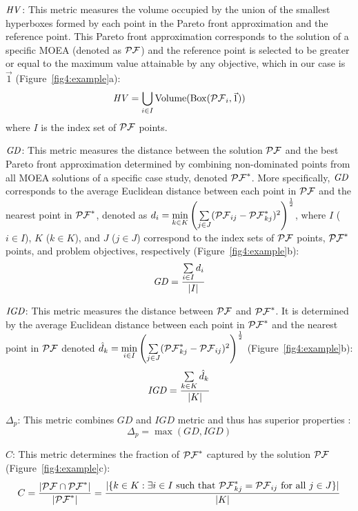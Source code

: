{$\mathit{HV}$: This metric measures the volume occupied by the union of the smallest hyperboxes formed by each point in the Pareto front approximation and the reference point.  This Pareto front approximation corresponds to the solution of a specific MOEA (denoted as $\mathcal{PF}$) and the reference point is selected to be greater or equal to the maximum value attainable by any objective, which in our case is $\vec{1}$ (Figure~\ref{fig4:example}a):
\begin{equation}
	\mathit{HV} = \bigcup\limits_{i\in I}\mathrm{Volume}(\mathrm{Box}(\mathcal{PF}_i,\vec{1})) \label{eq4:hv}
\end{equation}
where $I$ is the index set of $\mathcal{PF}$ points.

$\mathit{GD}$: This metric measures the distance between the solution $\mathcal{PF}$ and the best Pareto front approximation determined by combining non-dominated points from all MOEA solutions of a specific case study, denoted $\mathcal{PF}^*$. More specifically, $\mathit{GD}$ corresponds to the average Euclidean distance between each point in $\mathcal{PF}$ and the nearest point in $\mathcal{PF}^*$, denoted as $d_i=\min\limits_{k \in K}\left( \sum\limits_{j \in J}(\mathcal{PF}_{ij} -\mathcal{PF}^*_{kj})^2 \right)^{\frac{1}{2}}$, where $I$ ($i \in I$), $K$ ($k \in K$), and $J$ ($j \in J$) correspond to the index sets of $\mathcal{PF}$ points, $\mathcal{PF}^*$ points, and problem objectives, respectively (Figure~\ref{fig4:example}b):
\begin{equation}
	 \mathit{GD} = \frac{\sum\limits_{i \in I} d_i}{|I|}
\end{equation}

$\mathit{IGD}$: This metric measures the distance between $\mathcal{PF}$ and $\mathcal{PF}^*$. It is determined by the average Euclidean distance between each point in $\mathcal{PF}^*$ and the nearest point in $\mathcal{PF}$ denoted $\hat{d}_k=\min\limits_{i \in I}\left( \sum\limits_{j \in J}(\mathcal{PF}^*_{kj} - \mathcal{PF}_{ij})^2 \right)^{\frac{1}{2}}$ (Figure~\ref{fig4:example}b):
\begin{equation}
	\mathit{IGD} = \frac{\sum\limits_{k \in K} \hat{d}_k}{|K|}
\end{equation}

$\Delta_p$: This metric combines $\mathit{GD}$ and $\mathit{IGD}$ metric and thus has superior properties \cite{schutze2012}:
\begin{equation}
	 \Delta_p = \max(\mathit{GD},\mathit{IGD})
\end{equation}

$C$: This metric determines the fraction of $\mathcal{PF}^*$ captured by the solution $\mathcal{PF}$ (Figure~\ref{fig4:example}c):
\begin{equation}
	C = \frac{|\mathcal{PF} \cap \mathcal{PF}^*|}{|\mathcal{PF}^*|} = \frac{|\{ k \in K : \exists i \in I \textrm{ such that } \mathcal{PF}^*_{kj} = \mathcal{PF}_{ij} \textrm{ for all } j \in J \}|}{|K|}
\end{equation}

}
